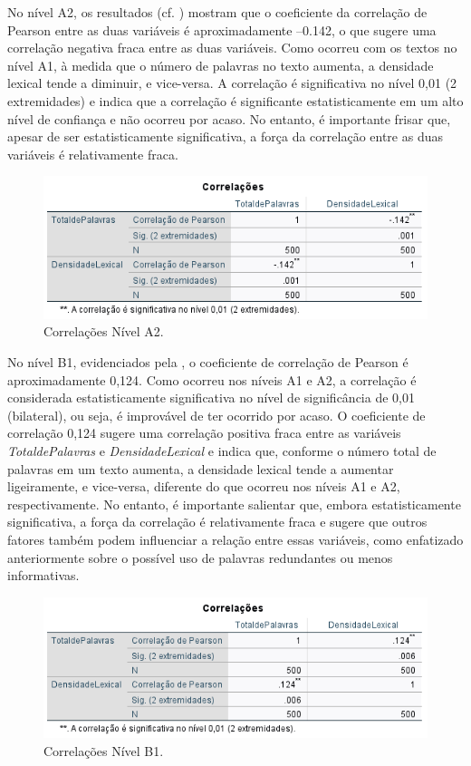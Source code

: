\documentclass[portuguese]{textolivre}
\begin{document}
No nível A2, os resultados (cf. ) mostram que o coeficiente da correlação de Pearson entre as duas variáveis é aproximadamente –0.142, o que sugere uma correlação negativa fraca entre as duas variáveis. Como ocorreu com os textos no nível A1, à medida que o número de palavras no texto aumenta, a densidade lexical tende a diminuir, e vice-versa. A correlação é significativa no nível 0,01 (2 extremidades) e indica que a correlação é significante estatisticamente em um alto nível de confiança e não ocorreu por acaso. No entanto, é importante frisar que, apesar de ser estatisticamente significativa, a força da correlação entre as duas variáveis é relativamente fraca.

\begin{figure}[h!]
    \centering
    \includegraphics[width=0.8\linewidth]{Fig11.png}
    \caption{Correlações Nível A2.}
    \label{fig11}
\end{figure}

No nível B1, evidenciados pela , o coeficiente de correlação de Pearson é aproximadamente 0,124. Como ocorreu nos níveis A1 e A2, a correlação é considerada estatisticamente significativa no nível de significância de 0,01 (bilateral), ou seja, é improvável de ter ocorrido por acaso. O coeficiente de correlação 0,124 sugere uma correlação positiva fraca entre as variáveis \textit{TotaldePalavras} e \textit{DensidadeLexical} e indica que, conforme o número total de palavras em um texto aumenta, a densidade lexical tende a aumentar ligeiramente, e vice-versa, diferente do que ocorreu nos níveis A1 e A2, respectivamente. No entanto, é importante salientar que, embora estatisticamente significativa, a força da correlação é relativamente fraca e sugere que outros fatores também podem influenciar a relação entre essas variáveis, como enfatizado anteriormente sobre o possível uso de palavras redundantes ou menos informativas.

\begin{figure}[h!]
    \centering
    \includegraphics[width=0.8\linewidth]{Fig12.png}
    \caption{Correlações Nível B1.}
    \label{fig12}
\end{figure}
\end{document}
